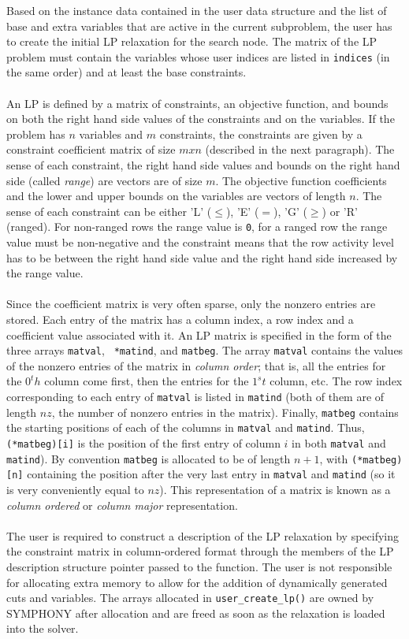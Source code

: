 Based on the instance data contained in the user data structure and
the list of base and extra variables that are active in the
current subproblem, the user has to create the initial LP relaxation
for the search node. The matrix of the LP problem must contain the
variables whose user indices are listed in {\tt indices} (in the same
order) and at least the base constraints. \\
\\
An LP is defined by a matrix of constraints, an objective function,
and bounds on both the right hand side values of the constraints and
on the variables. If the problem has $n$ variables and $m$
constraints, the constraints are given by a constraint coefficient
matrix of size $m x n$ (described in the next paragraph). The sense of
each constraint, the right hand side values and bounds on the right
hand side (called {\em range}) are vectors are of size $m$. The
objective function coefficients and the lower and upper bounds on the
variables are vectors of length $n$. The sense of each constraint can
be either 'L' ($\leq$), 'E' ($=$), 'G' ($\geq$) or 'R' (ranged). For
non-ranged rows the range value is {\tt 0}, for a ranged row the range
value must be non-negative and the constraint means that the row
activity level has to be between the right hand side value and the
right hand side increased by the range value. \\
\\
Since the coefficient matrix is very often sparse, only the nonzero
entries are stored. Each entry of the matrix has a column index, a row
index and a coefficient value associated with it. An LP matrix is
specified in the form of the three arrays {\tt *matval}, {\tt
*matind}, and {\tt *matbeg}. The array {\tt *matval} contains the
values of the nonzero entries of the matrix in {\em column order};
that is, all the entries for the $0^th$ column come first, then the
entries for the $1^st$ column, etc. The row index corresponding to
each entry of {\tt *matval} is listed in {\tt *matind} (both of them
are of length $nz$, the number of nonzero entries in the matrix).
Finally, {\tt *matbeg} contains the starting positions of each of the
columns in {\tt *matval} and {\tt *matind}. Thus, {\tt (*matbeg)[i]}
is the position of the first entry of column $i$ in both {\tt *matval}
and {\tt *matind}). By convention {\tt *matbeg} is allocated to be of
length $n+1$, with {\tt (*matbeg)[n]} containing the position after
the very last entry in {\tt *matval} and {\tt *matind} (so it is very
conveniently equal to $nz$). This representation of a matrix is known
as a {\em column ordered} or {\em column major} representation.\\
\\
The user is required to construct a description of the LP relaxation by
specifying the constraint matrix in column-ordered format through the members
of the LP description structure pointer passed to the function. The user is
not responsible for allocating extra memory to allow for the addition of
dynamically generated cuts and variables. The arrays allocated in
\texttt{user\_create\_lp()} are owned by SYMPHONY after allocation and are
freed as soon as the relaxation is loaded into the solver.

